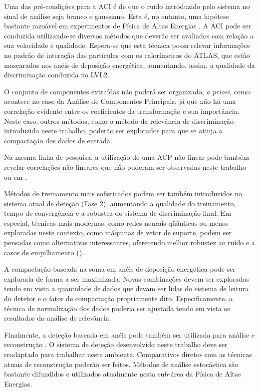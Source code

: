 Uma das pré-condições para a ACI é de que o ruído introduzido pelo sistema no
sinal de análise seja branco e gaussiano. Esta é, no entanto, uma hipótese
bastante razoável em experimentos de Física de Altas Energias \cite{knoll,
leo}. A ACI pode ser conduzida utilizando-se diversos métodos que deverão ser
avaliados com relação a sua velocidade e qualidade. Espera-se que esta técnica
possa relevar informações no padrão de interação das partículas com os
calorímetros do ATLAS, que estão mascarados nos anéis de deposição energética,
aumentando, assim, a qualidade da discriminação conduzida no LVL2.

O conjunto de componentes extraídas não poderá ser organizado, \textit{a
priori}, como acontece no caso da Análise de Componentes Principais, já que
não há uma correlação evidente entre os coeficientes da transformação e sua
importância. Neste caso, outros métodos, como o método da relevância de
discriminação introduzido neste trabalho, poderão ser explorados para que se
atinja a compactação dos dados de entrada.

Na mesma linha de pesquisa, a utilização de uma ACP não-linear pode também
revelar correlações não-lineares que não puderam ser observadas neste trabalho
ou em \cite{herman}.

Métodos de treinamento mais sofisticados podem ser também introduzidos no
sistema atual de deteção (Fase 2), aumentando a qualidade do treinamento,
tempo de convergência e a robustez do sistema de discriminação final. Em
especial, técnicas mais modernas, como redes neurais qüânticas \cite{qnns} ou
menos exploradas neste contexto, como máquinas de vetor de suporte,
\cite{haykin} podem ser pensadas como alternativas interessantes, oferecendo
melhor robustez ao ruído e a casos de empilhamento ().

A compactação baseada na soma em anéis de deposição energética pode ser
explorada de forma a ser maximizada. Novas combinações devem ser exploradas
tendo em vista a quantidade de dados que devam ser lidas do sistema de
leitura do detetor e o fator de compactação propriamente dito. Especificamente,
a técnica de normalização dos dados poderia ser ajustada tendo em vista os
resultados da análise de relevância.

Finalmente, a deteção baseada em anéis pode também ser utilizada para análise
e reconstrução . O sistema de deteção desenvolvido neste trabalho
deve ser readaptado para trabalhar neste ambiente. Comparativos diretos com
as técnicas atuais de reconstrução poderão ser feitos. Métodos de análise
estocástica são bastante difundidos e utilizados atualmente nesta sub-área da
Física de Altas Energias.

